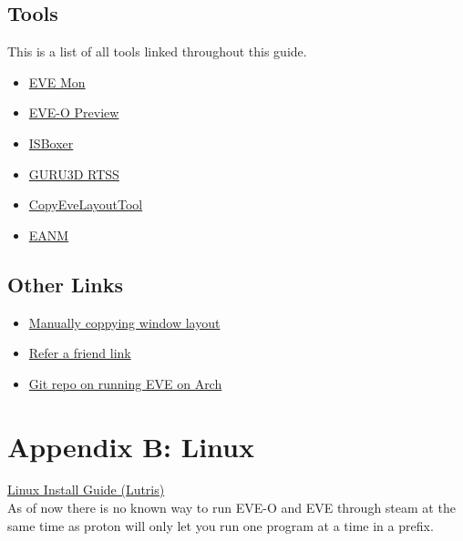 \documentclass{article}
\begin{document}
\subsection*{Tools}
This is a list of all tools linked throughout this guide.
\begin{itemize}
  \item \href{https://evemondevteam.github.io/evemon/}{EVE Mon}
  \item \href{https://github.com/Proopai/eve-o-preview}{EVE-O Preview}
  \item \href{https://isboxer.com/}{ISBoxer}
  \item \href{https://www.guru3d.com/download/rtss-rivatuner-statistics-server-download}{GURU3D RTSS}
  \item \href{https://github.com/kshannoninnes/CopyEveLayoutTool}{CopyEveLayoutTool}
  \item \href{URLhttps://github.com/FontaineRiant/EANM}{EANM}
\end{itemize}

\subsection*{Other Links}
\begin{itemize}
  \item \href{https://forums.eveonline.com/t/manually-copy-settings-between-characters-and-accounts/32704}{Manually coppying window layout}
  \item \href{https://www.eveonline.com/signup?invc=79ffb3de-ef43-400b-a568-e45ac72c6715}{Refer a friend link}
  \item \href{https://gist.github.com/arillat/2b7e519a69268f519d507d0ed50b9713}{Git repo on running EVE on Arch}
\end{itemize}

\section*{Appendix B: Linux}
\href{https://www.reddit.com/r/Eve/comments/1hqjm4a/linux_lutris_eve_online_eveo_preview/}{Linux Install Guide (Lutris)}\\
As of now there is no known way to run EVE-O and EVE through steam at the same time as proton will only let you run one program 
at a time in a prefix.

\end{document}
